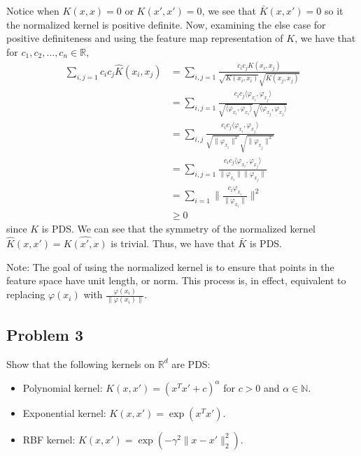 \documentclass[12pt]{article}
\begin{document}
Notice when $K(x, x) = 0$ or $K(x', x') = 0$, we see that $\bar{K}(x, x') = 0$ so it the
normalized kernel is positive definite. Now, examining the else case for positive definiteness and
using the feature map representation of $K$, we have that for $c_1, c_2, \dots, c_n \in \mathbb{R}$,
\begin{align*}
    \sum_{i,j=1}c_ic_j\hat{K}(x_i,x_j) &= \sum_{i,j=1}\frac{c_ic_jK(x_i, x_j)}{\sqrt{K(x_i, x_i)} \sqrt{K(x_j, x_j)}} \\
    &=\sum_{i,j=1}\frac{c_ic_j\langle\varphi_{x_i},\varphi_{x_j}\rangle}{\sqrt{\langle\varphi_{x_i},\varphi_{x_i}\rangle}\sqrt{\langle\varphi_{x_j},\varphi_{x_j}\rangle}} \\
    &=\sum_{i,j}\frac{c_ic_j\langle\varphi_{x_i},\varphi_{x_j}\rangle}{\sqrt{\|\varphi_{x_i}\|^2}\sqrt{\|\varphi_{x_j}\|^2}} \\
    &=\sum_{i,j=1}\frac{c_ic_j\langle\varphi_{x_i},\varphi_{x_j}\rangle}{\|\varphi_{x_i}\| \|\varphi_{x_j}\|} \\
    &=\sum_{i=1}\|\frac{c_i\varphi_{x_i}}{\|\varphi_{x_i}\|}\|^2 \\
    &\geq 0
\end{align*}
since $K$ is PDS. We can see that the symmetry of the normalized kernel $\hat{K}(x,x')=\hat{K(x',x)}$ is trivial. 
Thus, we have that $\bar{K}$ is PDS.

Note: The goal of using the normalized kernel is to ensure that points in the feature space have unit length, or norm.
This process is, in effect, equivalent to replacing $\varphi(x_i)$ with $\frac{\varphi(x_i)}{\|\varphi(x_i)\|}$.


\subsection*{Problem 3} %
\begin{mdframed}
    Show that the following kernels on $\mathbb{R}^{d}$ are PDS:
    \begin{itemize}
        \item Polynomial kernel: $K(x, x')=(x^{T} x'+c)^{\alpha}$ for $c>0$ and $\alpha \in \mathbb{N}$.
        \item Exponential kernel: $K(x, x')=\exp (x^Tx')$.
        \item RBF kernel: $K(x, x')=\exp (-\gamma^{2}\|x-x'\|_2^2)$.
    \end{itemize}
\end{mdframed}
\end{document}
